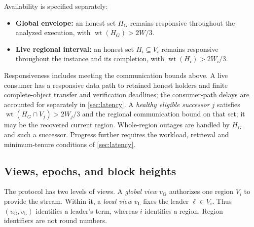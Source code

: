 \documentclass[11pt,a4paper,onecolumn]{article}
\newcommand{\gv}{v_{\mathrm G}}
\newcommand{\lv}{v_{\mathrm L}}
\newcommand{\wt}{\operatorname{wt}}
\theoremstyle{remark}\newtheorem{example}[definition]{Example}
\newcounter{protocol}
\begin{document}
Availability is specified separately:
\begin{itemize}
\item \textbf{Global envelope:} an honest set $H_G$ remains responsive
throughout the analyzed execution, with $\wt(H_G)>2W/3$.
\item \textbf{Live regional interval:} an honest set $H_i\subseteq V_i$ remains
responsive throughout the instance and its completion, with $\wt(H_i)>2W_i/3$.
\end{itemize}
Responsiveness includes meeting the communication bounds above.
A live consumer has a responsive data path to retained honest holders and
finite complete-object transfer and verification deadlines; the consumer-path
delays are accounted for separately in \cref{sec:latency}.
A \emph{healthy eligible successor} $j$ satisfies
$\wt(H_G\cap V_j)>2W_j/3$ and the regional communication bound on that set;
it may be the recovered current region. Whole-region outages are handled by
$H_G$ and such a successor. Progress further requires the workload, retrieval
and minimum-tenure conditions of \cref{sec:latency}.

\subsection{Views, epochs, and block heights}\label{sec:indices}
The protocol has two levels of views. A \emph{global view} $\gv$ authorizes one
region $V_i$ to provide the stream. Within it, a \emph{local view} $\lv$ fixes
the leader $\ell\in V_i$. Thus $(\gv,\lv)$ identifies a leader's term, whereas
$i$ identifies a region. Region identifiers are not round numbers.
\end{document}
